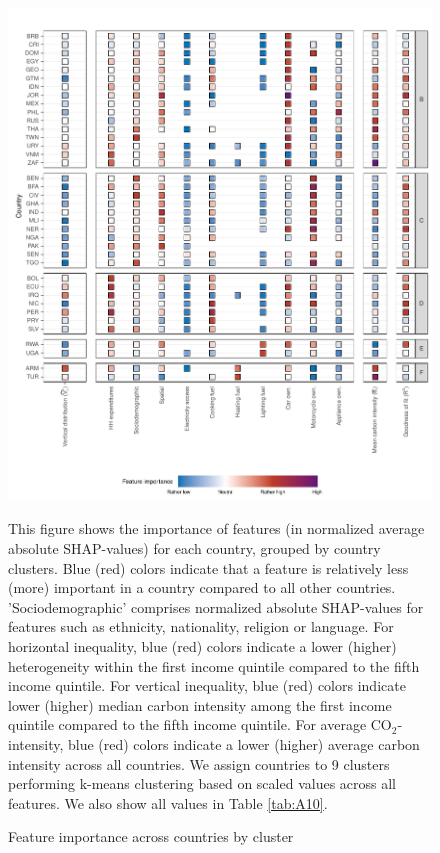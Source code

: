 \documentclass[12pt, a4paper]{article}
\newenvironment{subcaption2}
{\strut
\vspace{-5pt}
\begin{minipage}[b]{0.9\textwidth}
  \hspace*{-\parindent}
  \footnotesize}
 {\end{minipage}}
\begin{document}
\begin{figure}[ht!]
    \centering
    \includegraphics{Figure 4/Figure_4_Corrected_2}
    \caption{Feature importance across countries by cluster}
    \label{fig:fig_4_2}
    \begin{subcaption2}
    This figure shows the importance of features (in normalized average absolute SHAP-values) for each country, grouped by country clusters. Blue (red) colors indicate that a feature is relatively less (more) important in a country compared to all other countries. 'Sociodemographic' comprises normalized absolute SHAP-values for features such as ethnicity, nationality, religion or language.
    For horizontal inequality, blue (red) colors indicate a lower (higher) heterogeneity within the first income quintile compared to the fifth income quintile. For vertical inequality, blue (red) colors indicate lower (higher) median carbon intensity among the first income quintile compared to the fifth income quintile. For average CO$_{2}$-intensity, blue (red) colors indicate a lower (higher) average carbon intensity across all countries.
    We assign countries to 9 clusters performing k-means clustering based on scaled values across all features. We also show all values in Table \ref{tab:A10}.
    \end{subcaption2}
\end{figure}
\end{document}
